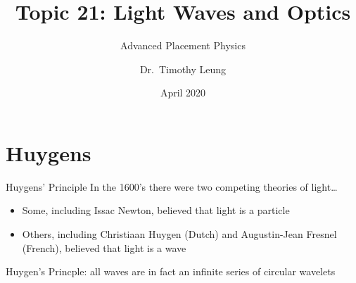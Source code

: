 \documentclass[compress,aspectratio=169]{beamer}
\title{Topic 21: Light Waves and Optics}
\subtitle{Advanced Placement Physics}
\author[TML]{Dr.\ Timothy Leung}
\institute{Olympiads School\\Toronto, Ontario, Canada}
\date{April 2020}
\begin{document}
\begin{frame}
  \maketitle
\end{frame}





\section{Huygens}

\begin{frame}{Huygens' Principle}
  In the 1600's there were two competing theories of light\ldots
  \begin{itemize}
  \item Some, including Issac Newton, believed that  light is a particle
  \item Others, including Christiaan Huygen (Dutch) and Augustin-Jean Fresnel
    (French), believed that light is a wave
  \end{itemize}
  \vspace{0.4in}

  Huygen's Princple: all waves are in fact an infinite series of circular
  wavelets
\end{frame}
\end{document}
